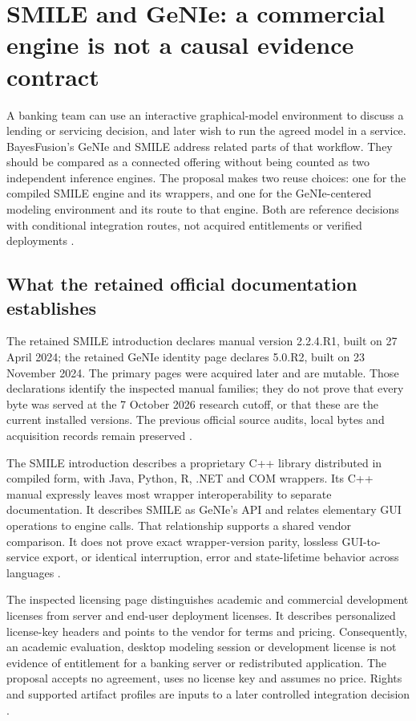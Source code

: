 \section{SMILE and GeNIe: a commercial engine is not a causal evidence contract}
\label{sec:exec24-smile-reuse}

A banking team can use an interactive graphical-model environment to discuss
a lending or servicing decision, and later wish to run the agreed model in
a service. BayesFusion's GeNIe and SMILE address related parts of that
workflow. They should be compared as a connected offering without being
counted as two independent inference engines. The proposal makes two reuse
choices: one for the compiled SMILE engine and its wrappers, and one for the
GeNIe-centered modeling environment and its route to that engine. Both are
reference decisions with conditional integration routes, not acquired
entitlements or verified deployments \citep{exec13_smile_intro,
exec13_smile_license,exec24_smile_choice}.

\subsection{What the retained official documentation establishes}
The retained SMILE introduction declares manual version 2.2.4.R1, built on
27 April 2024; the retained GeNIe identity page declares 5.0.R2, built on
23 November 2024. The primary pages were acquired later and are mutable.
Those declarations identify the inspected manual families; they do not
prove that every byte was served at the 7 October 2026 research cutoff,
or that these are the current installed versions. The previous official
source audits, local bytes and acquisition records remain preserved
\citep{exec13_smile_intro,exec13_genie_readme,exec24_smile_choice}.

The SMILE introduction describes a proprietary C++ library distributed in
compiled form, with Java, Python, R, .NET and COM wrappers. Its C++ manual
expressly leaves most wrapper interoperability to separate documentation.
It describes SMILE as GeNIe's API and relates elementary GUI operations to
engine calls. That relationship supports a shared vendor comparison. It
does not prove exact wrapper-version parity, lossless GUI-to-service export,
or identical interruption, error and state-lifetime behavior across languages
\citep{exec13_smile_intro}.

The inspected licensing page distinguishes academic and commercial
development licenses from server and end-user deployment licenses. It
describes personalized license-key headers and points to the vendor for
terms and pricing. Consequently, an academic evaluation, desktop modeling
session or development license is not evidence of entitlement for a banking
server or redistributed application. The proposal accepts no agreement,
uses no license key and assumes no price. Rights and supported artifact
profiles are inputs to a later controlled integration decision
\citep{exec13_smile_license,exec24_smile_choice}.

